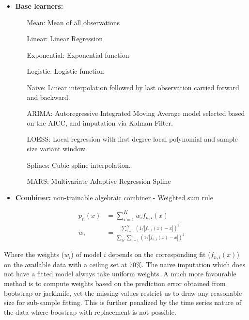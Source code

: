 \documentclass[nojss]{jss}\usepackage[]{graphicx}\usepackage[]{color}
\begin{document}
\begin{itemize}
  \item {\textbf{Base learners:}}
    \begin{itemize}
      \setlength{\leftmargini}{5em}
      \item[Mean:] Mean of all observations
      \item [Linear:] Linear Regression
      \item [Exponential:] Exponential function
      \item [Logistic:] Logistic function        
      \item [Naive:] Linear interpolation followed by last observation
        carried forward and backward.
      \item [ARIMA:] Autoregressive Integrated Moving Average model
        selected based on the AICC, and imputation via Kalman Filter.
      \item [LOESS:] Local regression with first degree local
        polynomial and sample size variant window.
      \item [Splines:] Cubic spline interpolation.
      \item [MARS:] Multivariate Adaptive Regression Spline
    \end{itemize}
  \item {\textbf{Combiner:}}
    non-trainable algebraic combiner - Weighted sum rule

    \begin{align}
      p_n(x) &= \sum_{i=1}^K w_i f_{n, i}(x) \nonumber \\
      w_i &= \frac{\sum_{i = 1}^N(1/|f_{n, i}(x) - x|)^2}{\sum_{K}\sum_{i=1}^n(1/|f_{n, i}(x) - x|)^2}\nonumber
    \end{align}
    
    
\end{itemize}

Where the weights ($w_i$) of model $i$ depends on the corresponding
fit ($f_{n, i}(x)$) on the available data with a ceiling set at
70\%. The naive imputation which does not have a fitted model always
take uniform weights. A much more favourable method is to compute
weights based on the prediction error obtained from bootstrap or
jackknife, yet the missing values restrict us to draw any reasonable
size for sub-sample fitting. This is further penalized by the time
series nature of the data where boostrap with replacement is not
possible.\\
\end{document}
